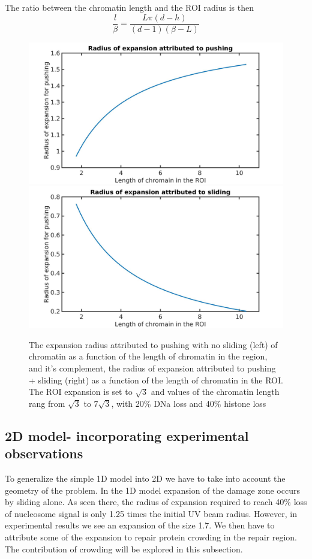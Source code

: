 \documentclass[12pt]{report}
\begin{document}
 The ratio between the chromatin length and the ROI radius is then 
 \begin{equation*}
 \frac{l}{\beta} =\frac{L\pi(d-h)}{(d-1)(\beta-L)} 
 \end{equation*}
\begin{figure}[H]

\includegraphics[width=0.5\linewidth, height=0.3\textheight]{Images/SlidingModel/radiusOfPushingVsLengthOfChromainInROI}
\includegraphics[width=0.5\linewidth, height=0.3\textheight]{Images/SlidingModel/radiusOfSlidingVsLengthOfChromatinInROI}
\caption{\tiny{The expansion radius attributed to pushing with no sliding (left) of chromatin as a function of the length of chromatin in the region, and it's complement, the radius of expansion attributed to pushing + sliding (right) as a function of the length of chromatin in the ROI. The ROI expansion is set to $\sqrt{3}$ and values of the chromatin length rang from $\sqrt{3}$ to $7\sqrt{3}$, with 20\% DNa loss and 40\% histone loss}}
\label{fig:radiiVsLengthOfChromainInROI}
\end{figure}

\subsection{2D model- incorporating experimental observations}\label{subsection:2dModel}
To generalize the simple 1D model into 2D we have to take into account the geometry of the problem. In the 1D model expansion of the damage zone occurs by sliding alone. As seen there, the radius of expansion required to reach 40\% loss of nucleosome signal is only 1.25 times the initial UV beam radius. However, in experimental results we see an expansion of the size 1.7. We then have to attribute some of the expansion to repair protein crowding in the repair region. The contribution of crowding will be explored in this subsection. 
\end{document}
